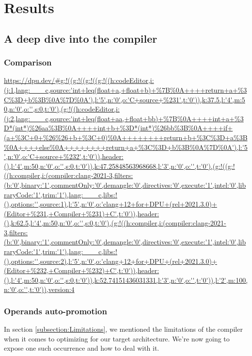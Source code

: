 \chapter{Results}

\section{A deep dive into the compiler}

\subsection{Comparison}
\url{https://dpu.dev/#g:!((g:!((g:!((g:!((h:codeEditor,i:(j:1,lang:___c,source:'int+leq(float+a,+float+b)+%7B%0A++++return+a+%3C%3D+b%3B%0A%7D%0A'),l:'5',n:'0',o:'C+source+%231',t:'0')),k:37.5,l:'4',m:50,n:'0',o:'',s:0,t:'0'),(g:!((h:codeEditor,i:(j:2,lang:___c,source:'int+leq(float+aa,+float+bb)+%7B%0A++++int+a+%3D*(int*)%26aa%3B%0A++++int+b+%3D*(int*)%26bb%3B%0A++++if+(a+%3C+0+%26%26+b+%3C+0)%0A++++++++return+b+%3C%3D+a%3B%0A++++else%0A++++++++return+a+%3C%3D+b%3B%0A%7D%0A'),l:'5',n:'0',o:'C+source+%232',t:'0')),header:(),l:'4',m:50,n:'0',o:'',s:0,t:'0')),k:47.25848563968668,l:'3',n:'0',o:'',t:'0'),(g:!((g:!((h:compiler,i:(compiler:clang-2021-3,filters:(b:'0',binary:'1',commentOnly:'0',demangle:'0',directives:'0',execute:'1',intel:'0',libraryCode:'1',trim:'1'),lang:___c,libs:!(),options:'',source:1),l:'5',n:'0',o:'clang+12+for+DPU+(rel+2021.3.0)+(Editor+%231,+Compiler+%231)+C',t:'0')),header:(),k:62.5,l:'4',m:50,n:'0',o:'',s:0,t:'0'),(g:!((h:compiler,i:(compiler:clang-2021-3,filters:(b:'0',binary:'1',commentOnly:'0',demangle:'0',directives:'0',execute:'1',intel:'0',libraryCode:'1',trim:'1'),lang:___c,libs:!(),options:'',source:2),l:'5',n:'0',o:'clang+12+for+DPU+(rel+2021.3.0)+(Editor+%232,+Compiler+%232)+C',t:'0')),header:(),l:'4',m:50,n:'0',o:'',s:0,t:'0')),k:52.74151436031331,l:'3',n:'0',o:'',t:'0')),l:'2',m:100,n:'0',o:'',t:'0')),version:4}

\subsection{Operands auto-promotion}

In section \ref{subsection:Limitations}, we mentioned the limitations of the compiler when it comes to optimizing for our target architecture. We're now going to expose one such occurrence and how to deal with it.

